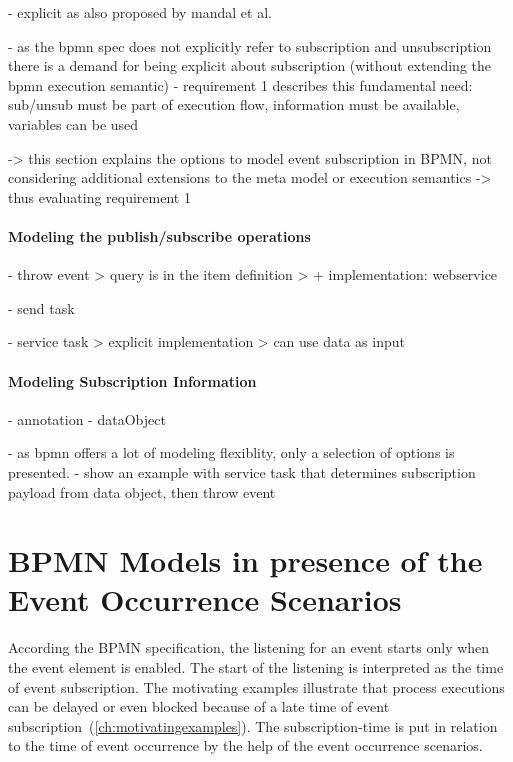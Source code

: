 - explicit as also proposed by mandal et al.

- as the bpmn spec does not explicitly refer to subscription and unsubscription there is a demand for being explicit about subscription (without extending the bpmn execution semantic)
- requirement 1 describes this fundamental need: sub/unsub must be part of execution flow, information must be available, variables can be used

-> this section explains the options to model event subscription in BPMN, not considering additional extensions to the meta model or execution semantics
-> thus evaluating requirement 1

\paragraph{Modeling the publish/subscribe operations}

- throw event
	> query is in the item definition
	> + implementation: webservice

- send task

- service task
	> explicit implementation
	> can use data as input

\paragraph{Modeling Subscription Information}
- annotation
- dataObject


- as bpmn offers a lot of modeling flexiblity, only a selection of options is presented.
- show an example with service task that determines subscription payload from data object, then throw event



\section{BPMN Models in presence of the Event Occurrence Scenarios}\label{ch:ass:models}
According the BPMN specification, the listening for an event starts only when the event element is enabled. The start of the listening is interpreted as the time of event subscription.
The motivating examples illustrate that process executions can be delayed or even blocked because of a late time of event subscription~(\autoref{ch:motivatingexamples}).
The subscription-time is put in relation to the time of event occurrence by the help of the event occurrence scenarios.

